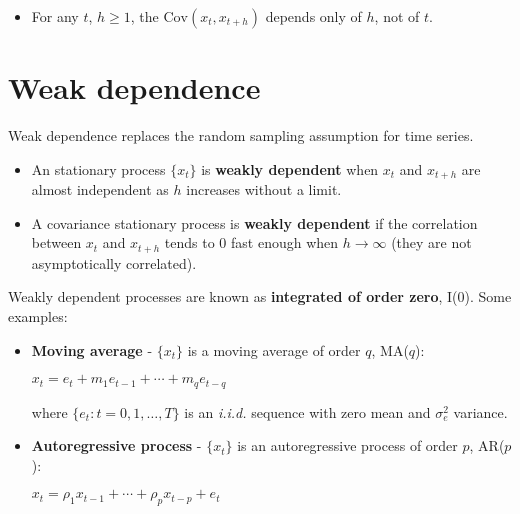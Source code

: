\documentclass[10pt, a4paper, landscape]{article}
\newcommand{\Var}{\mathrm{Var}}
\newcommand{\Cov}{\mathrm{Cov}}
\begin{document}
\begin{multicols}{3}
\begin{itemize}[leftmargin=*]
\begin{itemize}[leftmargin=*]
				
				\item For any $t$, $h \geq 1$, the $\Cov(x_{t}, x_{t + h})$ depends only of $h$, not of $t$.
			\end{itemize}
		\end{itemize}
		
		\section*{Weak dependence}
		
		Weak dependence replaces the random sampling assumption for time series.
		
		\begin{itemize}[leftmargin=*]
			\item An stationary process $\lbrace x_{t} \rbrace$ is \textbf{weakly dependent} when $x_{t}$ and $x_{t + h}$ are almost independent as $h$ increases without a limit.
			\item A covariance stationary process is \textbf{weakly dependent} if the correlation between $x_{t}$ and $x_{t + h}$ tends to $0$ fast enough when $h \rightarrow \infty$ (they are not asymptotically correlated).
		\end{itemize}
		
		Weakly dependent processes are known as \textbf{integrated of order zero}, I(0). Some examples:
		
		\begin{itemize}[leftmargin=*]
			\item \textbf{Moving average} - $\lbrace x_{t} \rbrace$ is a moving average of order $q$, MA($q$):
			
			\begin{center}
				$x_{t} = e_{t} + m_{1} e_{t - 1} + \cdots + m_{q} e_{t - q}$
			\end{center}
			
			where $\lbrace e_{t} : t = 0, 1, \ldots, T \rbrace$ is an \textsl{i.i.d.} sequence with zero mean and $\sigma^{2}_{e}$ variance.
			
			\item \textbf{Autoregressive process} - $\lbrace x_{t} \rbrace$ is an autoregressive process of order $p$, AR($p$):
			
			\begin{center}
				$x_{t} = \rho_{1} x_{t - 1} + \cdots + \rho_{p} x_{t - p} + e_{t}$
			\end{center}
			

\end{itemize}
\end{multicols}
\end{document}
